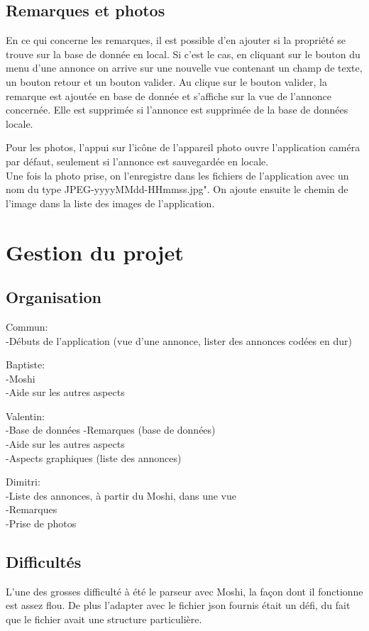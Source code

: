 \documentclass[a4paper,12pt]{article} %
\begin{document}
\subsection{Remarques et photos}
En ce qui concerne les remarques, il est possible d'en ajouter si la propriété se trouve sur la base de donnée en local. Si c'est le cas, en cliquant sur le bouton du menu d'une annonce on arrive sur une nouvelle vue contenant un champ de texte, un bouton retour et un bouton valider.
Au clique sur le bouton valider, la remarque est ajoutée en base de donnée et s'affiche sur la vue de l'annonce concernée. Elle est supprimée si l'annonce est supprimée de la base de données locale.
\vspace{1cm}

Pour les photos, l'appui sur l'icône de l'appareil photo ouvre l'application caméra par défaut, seulement si l'annonce est sauvegardée en locale.\\
Une fois la photo prise, on l'enregistre dans les fichiers de l'application avec un nom du type JPEG-yyyyMMdd-HHmmss.jpg". On ajoute ensuite le chemin de l'image dans la liste des images de l'application.

\section{Gestion du projet}

\subsection{Organisation}
Commun:\\
-Débuts de l'application (vue d'une annonce, lister des annonces codées en dur)
\vspace{0.5cm}

Baptiste:\\
-Moshi\\
-Aide sur les autres aspects
\vspace{0.5cm}

Valentin:\\
-Base de données
-Remarques (base de données)\\
-Aide sur les autres aspects\\
-Aspects graphiques (liste des annonces)
\vspace{0.5cm}

Dimitri:\\
-Liste des annonces, à partir du Moshi, dans une vue\\
-Remarques\\
-Prise de photos

\subsection{Difficultés}
L'une des grosses difficulté à été le parseur avec Moshi, la façon dont il fonctionne est assez flou. De plus l'adapter avec le fichier json fournis était un défi, du fait que le fichier avait une structure particulière.
\end{document}
